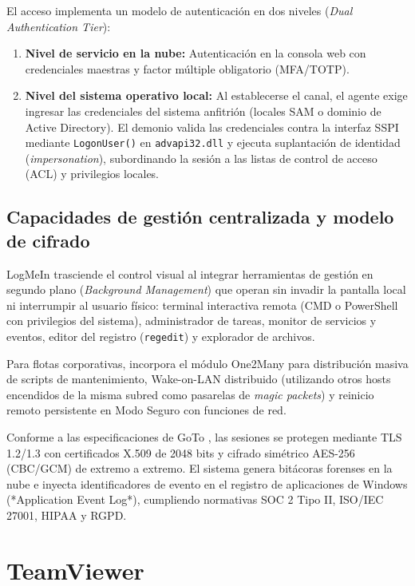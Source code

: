 \documentclass[12pt]{article}
\begin{document}
El acceso implementa un modelo de autenticación en dos niveles (\textit{Dual Authentication Tier}):
\begin{enumerate}[noitemsep, topsep=4pt]
    \item \textbf{Nivel de servicio en la nube:} Autenticación en la consola web con credenciales maestras y factor múltiple obligatorio (MFA/TOTP).
    \item \textbf{Nivel del sistema operativo local:} Al establecerse el canal, el agente exige ingresar las credenciales del sistema anfitrión (locales SAM o dominio de Active Directory). El demonio valida las credenciales contra la interfaz SSPI mediante \texttt{LogonUser()} en \texttt{advapi32.dll} y ejecuta suplantación de identidad (\textit{impersonation}), subordinando la sesión a las listas de control de acceso (ACL) y privilegios locales.
\end{enumerate}

\subsection{Capacidades de gestión centralizada y modelo de cifrado}\label{sec:logmeinGestionCifrado}

LogMeIn trasciende el control visual al integrar herramientas de gestión en segundo plano (\textit{Background Management}) que operan sin invadir la pantalla local ni interrumpir al usuario físico: terminal interactiva remota (CMD o PowerShell con privilegios del sistema), administrador de tareas, monitor de servicios y eventos, editor del registro (\texttt{regedit}) y explorador de archivos.

Para flotas corporativas, incorpora el módulo One2Many para distribución masiva de scripts de mantenimiento, Wake-on-LAN distribuido (utilizando otros hosts encendidos de la misma subred como pasarelas de \textit{magic packets}) y reinicio remoto persistente en Modo Seguro con funciones de red.

Conforme a las especificaciones de GoTo \parencite{gotoLogmeinSecurity}, las sesiones se protegen mediante TLS 1.2/1.3 con certificados X.509 de 2048 bits y cifrado simétrico AES-256 (CBC/GCM) de extremo a extremo. El sistema genera bitácoras forenses en la nube e inyecta identificadores de evento en el registro de aplicaciones de Windows (*Application Event Log*), cumpliendo normativas SOC 2 Tipo II, ISO/IEC 27001, HIPAA y RGPD.

\section{TeamViewer}\label{sec:teamViewer}
\end{document}
